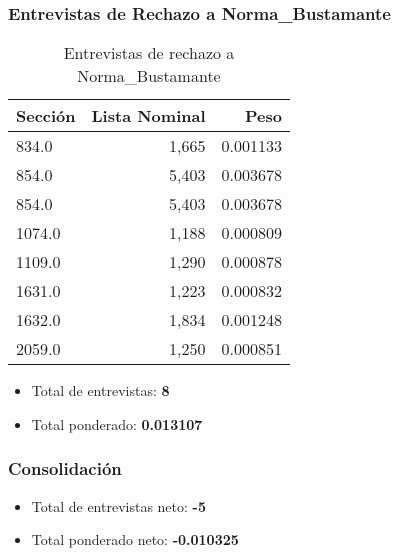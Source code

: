 \documentclass[a4paper,12pt]{article}
\begin{document}
\subsubsection*{Entrevistas de Rechazo a Norma_Bustamante}
\begin{table}[h]
\centering
\begin{tabular}{lrr}
\toprule
Sección & Lista Nominal & Peso \\ \midrule
834.0 & 1,665 & 0.001133 \\ 
854.0 & 5,403 & 0.003678 \\ 
854.0 & 5,403 & 0.003678 \\ 
1074.0 & 1,188 & 0.000809 \\ 
1109.0 & 1,290 & 0.000878 \\ 
1631.0 & 1,223 & 0.000832 \\ 
1632.0 & 1,834 & 0.001248 \\ 
2059.0 & 1,250 & 0.000851 \\ 
\bottomrule
\end{tabular}
\caption{Entrevistas de rechazo a Norma_Bustamante}
\end{table}

\begin{itemize}
\item Total de entrevistas: \textbf{8}
\item Total ponderado: \textbf{0.013107}
\end{itemize}

\subsubsection*{Consolidación}
\begin{itemize}
\item Total de entrevistas neto: \textbf{-5}
\item Total ponderado neto: \textbf{-0.010325}
\end{itemize}
\end{document}
